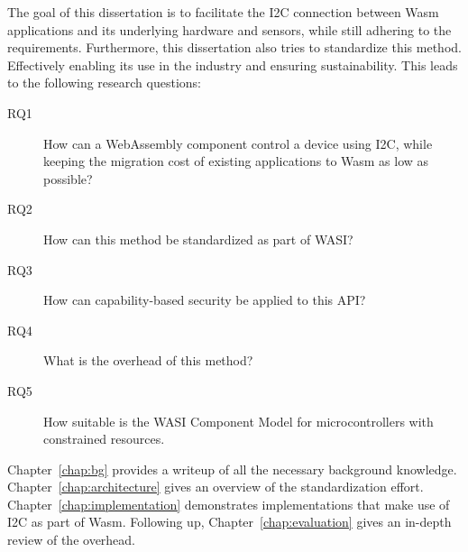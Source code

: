 \newpage

The goal of this dissertation is to facilitate the \gls{I2C} connection between \gls{Wasm} applications and its underlying hardware and sensors, while still adhering to the requirements. Furthermore, this dissertation also tries to standardize this method. Effectively enabling its use in the industry and ensuring sustainability. This leads to the following research questions:

\begin{description}
    \item[RQ1] How can a WebAssembly component control a device using I2C, while keeping the migration cost of existing applications to Wasm as low as possible?
    \item[RQ2] How can this method be standardized as part of WASI?
    \item[RQ3] How can capability-based security be applied to this API?
    \item[RQ4] What is the overhead of this method?
    \item[RQ5] How suitable is the \gls{WASI} Component Model for microcontrollers with constrained resources.
\end{description}

Chapter~\ref{chap:bg} provides a writeup of all the necessary background knowledge. Chapter~\ref{chap:architecture} gives an overview of the standardization effort. Chapter~\ref{chap:implementation} demonstrates implementations that make use of I2C as part of Wasm. Following up, Chapter~\ref{chap:evaluation} gives an in-depth review of the overhead. 
